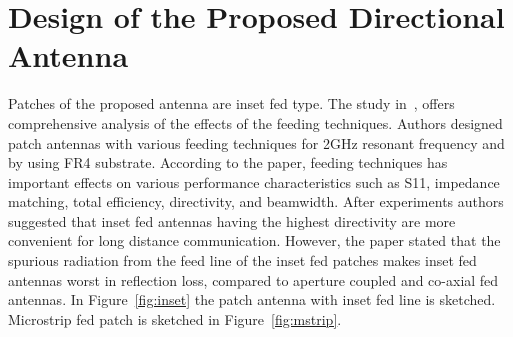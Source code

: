 \documentclass[12pt, oneandhalf, chaparabic, sees, ms]{metu}
\begin{document}
\newpage
\section{Design of the Proposed Directional Antenna}\label{sdesignantenna}


Patches of the proposed antenna are inset fed type. The study in~\cite{chakravarthy2016}, offers comprehensive analysis of the effects of the feeding techniques.
Authors designed patch antennas with various feeding techniques for 2GHz resonant frequency and by using FR4 substrate.
According to the paper, feeding techniques has important effects on various performance
characteristics such as S11, impedance matching, total efficiency, directivity, and beamwidth. After experiments authors suggested that inset fed antennas 
having the highest directivity are more convenient for long distance communication. 
However, the paper stated that the spurious radiation from the feed line of the inset fed patches makes inset fed antennas worst in reflection loss, 
compared to aperture coupled and co-axial fed antennas.
In Figure~\ref{fig:inset} the patch antenna with inset fed line is sketched. Microstrip fed patch is sketched in Figure~\ref{fig:mstrip}.
% 
%
% 
\end{document}
